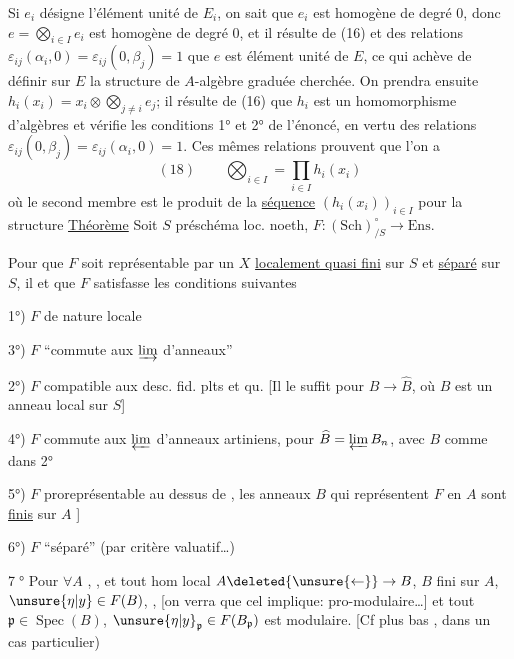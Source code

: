 Si $e_i$ désigne l'élément unité de $E_i$, on sait que $e_i$ est homogène de degré 0, donc $e=\bigotimes_{i\in I}e_i$ est homogène de degré 0, et il résulte de (16) et des relations $\varepsilon_{ij}(\alpha_i,0)=\varepsilon_{ij}(0,\beta_j)=1$ que $e$ est élément unité de $E$, ce qui achève de définir sur $E$ la structure de $A$-algèbre graduée cherchée. On prendra ensuite $h_i(x_i)=x_i\otimes\bigotimes_{j\ne i}e_j$; il résulte de (16) que $h_i$ est un homomorphisme d'algèbres et vérifie les conditions 1° et 2° de l'énoncé, en vertu des relations $\varepsilon_{ij}(0,\beta_j)=\varepsilon_{ij}(\alpha_i,0)=1$. Ces mêmes relations prouvent que l'on a
\[
(18)\qquad \bigotimes_{i\in I}=\prod_{i\in I}h_i(x_i)
\]
où le second membre est le produit de la \uline{séquence} $(h_i(x_i))_{i\in I}$ pour la structure
\uline{Théorème} Soit $S$ préschéma loc. noeth, $F:(\mathrm{Sch})_{/S}^{\circ}\to\mathrm{Ens}$.

Pour que $F$ soit représentable par un $X$ \uline{localement quasi fini} sur $S$ et \uline{séparé} sur $S$, il  et  que $F$ satisfasse les conditions suivantes

1°) $F$ de nature locale

3°) $F$ ``commute aux $\varinjlim$ d'anneaux''

2°) $F$ compatible aux desc. fid. plts et qu. 
[Il le suffit pour $B\to\widehat B$, où $B$ est un anneau local  sur $S$] 

4°) $F$ commute aux $\varprojlim$ d'anneaux artiniens, pour $\widehat B=\varprojlim B_n$, avec $B$ comme dans 2°

5°) $F$ proreprésentable au dessus de ,  les anneaux $B$ qui représentent $F$ en $A$ sont \uline{finis} sur $A$ ]

6°) $F$ ``séparé'' (par critère valuatif\ldots)

\textcircled{7°} Pour  $\forall A$ , , et tout hom local $A\deleted{\unsure{\leftarrow}}\to B$, $B$ fini sur $A$,  $\unsure{\eta|y}\in F(B)$, ,  [on verra que cel implique: pro-modulaire\ldots] et tout $\mathfrak p\in\operatorname{Spec}(B)$, $\unsure{\eta|y}_{\mathfrak p}\in F(B_{\mathfrak p})$ est modulaire. [Cf plus bas , dans un cas particulier)

